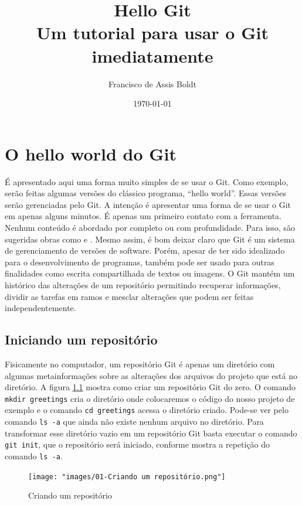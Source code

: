 \documentclass[a4paper]{book}
\title{Hello Git\\
\large Um tutorial para usar o Git imediatamente}
\author{Francisco de Assis Boldt}
\date{\today}
\begin{document}
  
\maketitle
  
\tableofcontents

\chapter{O hello world do Git}

É apresentado aqui uma forma muito simples de se usar o Git.
Como exemplo, serão feitas algumas versões do clássico programa, 
``hello world''. Essas versões serão gerenciadas pelo Git.
A intenção é apresentar uma forma de se usar o Git em apenas
alguns minutos. É apenas um primeiro contato com a ferramenta.
Nenhum conteúdo é abordado por completo ou com profundidade.
Para isso, são sugeridas obras como \cite{hodson2014ry} e 
\cite{chacon2014pro}.
Mesmo assim, é bom deixar claro que Git é um sistema de
gerenciamento de versões de software.
Porém, apesar de ter sido idealizado para o desenvolvimento
de programas, também pode ser usado para outras finalidades
como escrita compartilhada de textos ou imagens.
O Git mantém um histórico das alterações de um repositório 
permitindo recuperar informações, dividir as tarefas em ramos
e mesclar alterações que podem ser feitas independentemente.

\section{Iniciando um repositório}

Fisicamente no computador, um repositório Git é apenas um
diretório com algumas metainformações sobre as alterações 
dos arquivos do projeto que está no diretório.
A figura \ref{fig:01} mostra como criar um repositório Git
do zero. O comando \texttt{mkdir greetings} cria o diretório
onde colocaremos o código do nosso projeto de exemplo e o
comando \texttt{cd greetings}  acessa o diretório criado.
Pode-se ver pelo comando \texttt{ls -a} que ainda não existe
nenhum  arquivo no diretório. Para transformar esse diretório
vazio em um repositório Git basta executar o comando
\texttt{git init}, que o repositório será iniciado, conforme
mostra a repetição do comando \texttt{ls -a}.

\begin{figure}[ht]
\caption{Criando um repositório}
\label{fig:01}
\centering
\texttt{[image: "images/01-Criando um repositório.png"]}
\end{figure}
\end{document}
